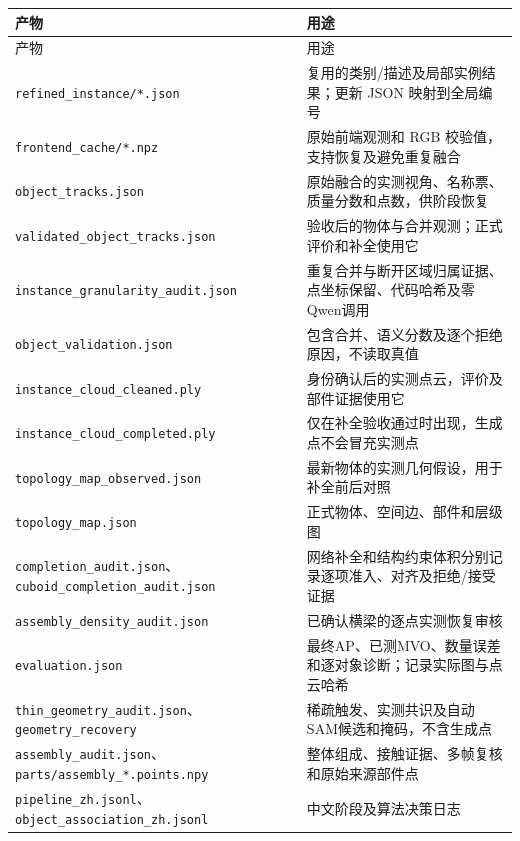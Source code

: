 \documentclass[UTF8,fontset=fandol]{ctexart}
\begin{document}
{\small
\begin{longtable}{|p{}|p{}|}
\hline
产物 & 用途 \\ \hline
\endfirsthead
\hline
产物 & 用途 \\ \hline
\endhead
\texttt{refined\_\allowbreak{}instance/\allowbreak{}*.\allowbreak{}json} & 复用的类别/描述及局部实例结果；更新 JSON 映射到全局编号 \\ \hline
\texttt{frontend\_\allowbreak{}cache/\allowbreak{}*.\allowbreak{}npz} & 原始前端观测和 RGB 校验值，支持恢复及避免重复融合 \\ \hline
\texttt{object\_\allowbreak{}tracks.\allowbreak{}json} & 原始融合的实测视角、名称票、质量分数和点数，供阶段恢复 \\ \hline
\texttt{validated\_\allowbreak{}object\_\allowbreak{}tracks.\allowbreak{}json} & 验收后的物体与合并观测；正式评价和补全使用它 \\ \hline
\texttt{instance\_\allowbreak{}granularity\_\allowbreak{}audit.\allowbreak{}json} & 重复合并与断开区域归属证据、点坐标保留、代码哈希及零Qwen调用 \\ \hline
\texttt{object\_\allowbreak{}validation.\allowbreak{}json} & 包含合并、语义分数及逐个拒绝原因，不读取真值 \\ \hline
\texttt{instance\_\allowbreak{}cloud\_\allowbreak{}cleaned.\allowbreak{}ply} & 身份确认后的实测点云，评价及部件证据使用它 \\ \hline
\texttt{instance\_\allowbreak{}cloud\_\allowbreak{}completed.\allowbreak{}ply} & 仅在补全验收通过时出现，生成点不会冒充实测点 \\ \hline
\texttt{topology\_\allowbreak{}map\_\allowbreak{}observed.\allowbreak{}json} & 最新物体的实测几何假设，用于补全前后对照 \\ \hline
\texttt{topology\_\allowbreak{}map.\allowbreak{}json} & 正式物体、空间边、部件和层级图 \\ \hline
\texttt{completion\_\allowbreak{}audit.\allowbreak{}json}、\texttt{cuboid\_\allowbreak{}completion\_\allowbreak{}audit.\allowbreak{}json} & 网络补全和结构约束体积分别记录逐项准入、对齐及拒绝/接受证据 \\ \hline
\texttt{assembly\_\allowbreak{}density\_\allowbreak{}audit.\allowbreak{}json} & 已确认横梁的逐点实测恢复审核 \\ \hline
\texttt{evaluation.\allowbreak{}json} & 最终AP、已测MVO、数量误差和逐对象诊断；记录实际图与点云哈希 \\ \hline
\texttt{thin\_\allowbreak{}geometry\_\allowbreak{}audit.\allowbreak{}json}、\texttt{geometry\_\allowbreak{}recovery} & 稀疏触发、实测共识及自动SAM候选和掩码，不含生成点 \\ \hline
\texttt{assembly\_\allowbreak{}audit.\allowbreak{}json}、\texttt{parts/\allowbreak{}assembly\_\allowbreak{}*.\allowbreak{}points.\allowbreak{}npy} & 整体组成、接触证据、多帧复核和原始来源部件点 \\ \hline
\texttt{pipeline\_\allowbreak{}zh.\allowbreak{}jsonl}、\texttt{object\_\allowbreak{}association\_\allowbreak{}zh.\allowbreak{}jsonl} & 中文阶段及算法决策日志 \\ \hline
\end{longtable}
}
\end{document}
